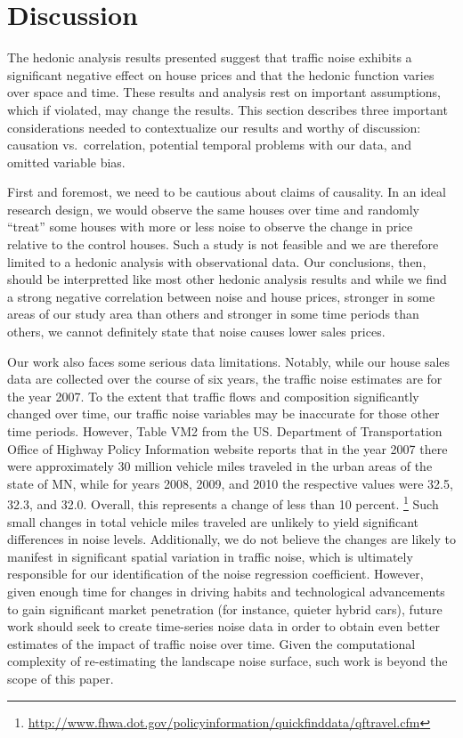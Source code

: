 \documentclass{article}\usepackage{graphicx, color}
\begin{document}
\section{Discussion}\label{Discussion}

The hedonic analysis results presented suggest that traffic noise exhibits a significant negative effect on house prices and that the hedonic function varies over space and time. These results and analysis rest on important assumptions, which if violated, may change the results. This section describes three important considerations needed to contextualize our results and worthy of discussion: causation vs.\ correlation, potential temporal problems with our data, and omitted variable bias.

First and foremost, we need to be cautious about claims of causality. In an ideal research design, we would observe the same houses over time and randomly ``treat'' some houses with more or less noise to observe the change in price relative to the control houses. Such a study is not feasible and we are therefore limited to a hedonic analysis with observational data. Our conclusions, then, should be interpretted like most other hedonic analysis results and while we find a strong negative correlation between noise and house prices, stronger in some areas of our study area than others and stronger in some time periods than others, we cannot definitely state that noise causes lower sales prices.

Our work also faces some serious data limitations. Notably, while our house sales data are collected over the course of six years, the traffic noise estimates are for the year 2007. To the extent that traffic flows and composition significantly changed over time, our traffic noise variables may be inaccurate for those other time periods. However, Table VM2 from the US. Department of Transportation Office of Highway Policy Information website reports that in the year 2007 there were approximately 30 million vehicle miles traveled in the urban areas of the state of MN, while for years 2008, 2009, and 2010 the respective values were 32.5, 32.3, and 32.0. Overall, this represents a change of less than 10 percent. \footnote{\url{http://www.fhwa.dot.gov/policyinformation/quickfinddata/qftravel.cfm}} Such small changes in total vehicle miles traveled are unlikely to yield significant differences in noise levels. Additionally, we do not believe the changes are likely to manifest in significant spatial variation in traffic noise, which is ultimately responsible for our identification of the noise regression coefficient. However, given enough time for changes in driving habits and technological advancements to gain significant market penetration (for instance, quieter hybrid cars), future work should seek to create time-series noise data in order to obtain even better estimates of the impact of traffic noise over time. Given the computational complexity of re-estimating the landscape noise surface, such work is beyond the scope of this paper.
\end{document}
